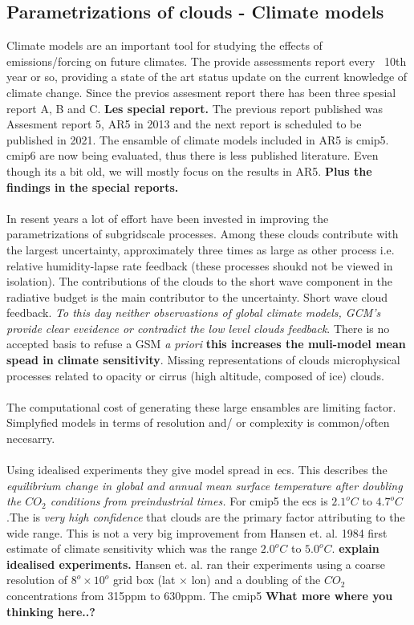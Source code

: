 \subsection{Parametrizations of clouds - Climate models} \label{sec:params_climate_models}
Climate models are an important tool for studying the effects of emissions/forcing on future climates. The  provide assessments report every ~10th year or so, providing a state of the art status update on the current knowledge of climate change. Since the previos assesment report there has been three spesial report A, B and C. \textbf{Les special report.} The previous report published was Assesment report 5, AR5 in 2013 and the next report is scheduled to be published in 2021. The ensamble of climate models included in AR5 is \acrfull{cmip5}. \acrshort{cmip6} are now being evaluated, thus there is less published literature. Even though its a bit old, we will mostly focus on the results in AR5. \textbf{Plus the findings in the special reports.}
\\ \\
In resent years a lot of effort have been invested in improving the parametrizations of subgridscale processes. Among these clouds contribute with the largest uncertainty, approximately three times as large as other process i.e. relative humidity-lapse rate feedback (these processes shoukd not be viewed in isolation). The contributions of the clouds to the short wave component in the radiative budget is the main contributor to the uncertainty. Short wave cloud feedback. \textit{To this day neither observastions of global climate models, GCM's provide clear eveidence or contradict the low level clouds feedback}. There is no accepted basis to refuse a GSM \textit{a priori} \textbf{this increases the muli-model mean spead in climate sensitivity}. Missing representations of clouds microphysical processes related to opacity or cirrus (high altitude, composed of ice) clouds.
\\ \\
The computational cost of generating these large ensambles are limiting factor. Simplyfied models in terms of resolution and/ or complexity is common/often necesarry. 
\\ \\ 
Using idealised experiments they give model spread in \acrfull{ecs}. This describes the \textit{equilibrium change in global and annual mean surface temperature after doubling the $CO_2$ conditions from preindustrial times.}
For \acrshort{cmip5} the \acrshort{ecs} is $2.1^oC$ to $4.7^oC$.The is \textit{very high confidence} that clouds are the primary factor attributing to the wide range. This is not a very big improvement from Hansen et. al. 1984 first estimate of climate sensitivity which was the range $2.0^oC$ to $5.0^oC$. \textbf{explain idealised experiments.} Hansen et. al. ran their experiments using a coarse resolution of $8^o \times 10^o$ grid box (lat $\times$ lon) and a doubling of the $CO_2$ concentrations from 315ppm to 630ppm. The \acrshort{cmip5} \textbf{What more where you thinking here..?}

